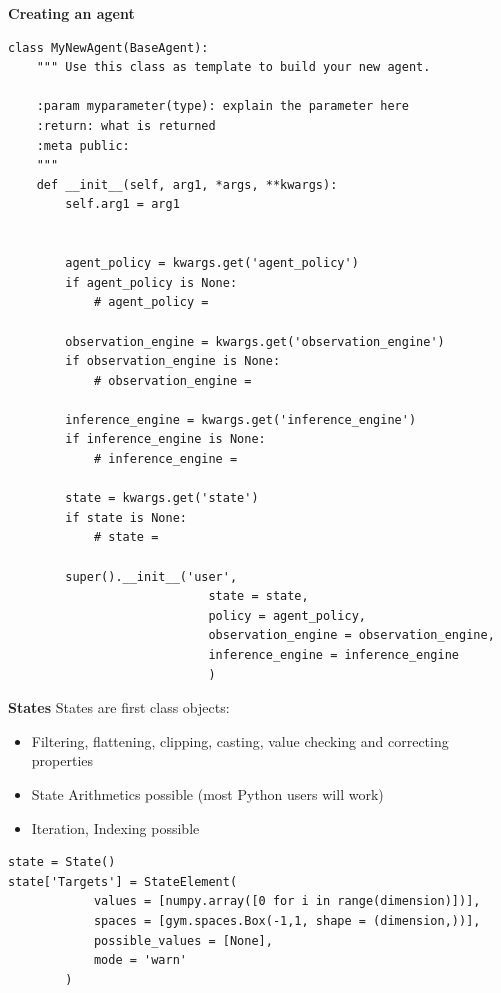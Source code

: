 \documentclass[11pt, xcolor = {dvipsnames}]{beamer}
\begin{document}
\begin{frame}[fragile]{\textbf{Creating an agent}}
\begin{adjustbox}{height=.4\textheight}\lstset{language=Python}
\lstset{frame=lines}
\lstset{basicstyle=\footnotesize}
\begin{lstlisting}
class MyNewAgent(BaseAgent):
    """ Use this class as template to build your new agent.

    :param myparameter(type): explain the parameter here
    :return: what is returned
    :meta public:
    """
    def __init__(self, arg1, *args, **kwargs):
        self.arg1 = arg1


        agent_policy = kwargs.get('agent_policy')
        if agent_policy is None:
            # agent_policy =

        observation_engine = kwargs.get('observation_engine')
        if observation_engine is None:
            # observation_engine =

        inference_engine = kwargs.get('inference_engine')
        if inference_engine is None:
            # inference_engine =

        state = kwargs.get('state')
        if state is None:
            # state =

        super().__init__('user',
                            state = state,
                            policy = agent_policy,
                            observation_engine = observation_engine,
                            inference_engine = inference_engine
                            )

\end{lstlisting}
\end{adjustbox}
\end{frame}


\begin{frame}[fragile]{\textbf{States}}
States are first class objects:
\begin{itemize}
\item Filtering, flattening, clipping, casting, value checking and correcting properties
\item State Arithmetics possible (most Python users will work)
\item Iteration, Indexing possible
\end{itemize}

\begin{adjustbox}{width=.8\textwidth}
\lstset{language=Python}
\lstset{frame=lines}
\lstset{basicstyle=\footnotesize}
\begin{lstlisting}
state = State()
state['Targets'] = StateElement(
            values = [numpy.array([0 for i in range(dimension)])],
            spaces = [gym.spaces.Box(-1,1, shape = (dimension,))],
            possible_values = [None],
            mode = 'warn'
        )
\end{lstlisting}
\end{adjustbox}

\end{frame}
\end{document}
